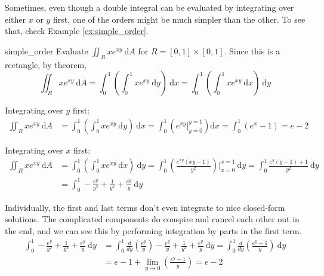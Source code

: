 Sometimes, even though a double integral can be evaluated by integrating over either $x$ or $y$ first, one of the orders might be much simpler than the other. To see that, check Example \ref{ex:simple_order}.

\begin{aexample}{}{simple_order}
    Evaluate $ \iint_R x e^{xy} \ \mathrm{d} A$ for $R = [0,1] \times [0,1]$. Since this is a rectangle, by  theorem,
    \begin{equation*}
        \iint_R x e^{xy} \ \mathrm{d} A = \int_{0}^{1} \left( \int_{0}^{1} x e^{xy} \ \mathrm{d} y\right) \ \mathrm{d} x = \int_{0}^{1} \left( \int_{0}^{1} x e^{xy} \ \mathrm{d} x\right) \ \mathrm{d} y
    \end{equation*}

    Integrating over $y$ first:
    \begin{equation*}
        \begin{aligned}
            \iint_R x e^{xy} \ \mathrm{d} A &= \int_{0}^{1} \left( \int_{0}^{1} x e^{xy} \ \mathrm{d} y\right) \ \mathrm{d} x = \int_{0}^{1} \left( e^{xy}\biggr \rvert_{y=0}^{y=1}\right) \mathrm{d} x =\int_{0}^{1} \left(e^x-1\right) = e-2
        \end{aligned}
    \end{equation*}

    Integrating over $x$ first:
    \begin{equation*}
        \begin{aligned}
            \iint_R x e^{xy} \ \mathrm{d} A &= \int_{0}^{1} \left( \int_{0}^{1} x e^{xy} \ \mathrm{d} x\right) \ \mathrm{d} y = \int_{0}^{1} \left( \frac{e^{x y} (x y-1)}{y^2} \right) \biggr \rvert_{x=0}^{x=1}\ \mathrm{d} y = \int_{0}^{1} \frac{e^y (y-1)+1}{y^2} \ \mathrm{d} y \\
            &= \int_{0}^{1} -\frac{e^y}{y^2}+\frac{1}{y^2}+\frac{e^y}{y} \ \mathrm{d} y
        \end{aligned}
    \end{equation*}

    Individually, the first and last terms don't even integrate to nice closed-form solutions. The complicated components do conspire and cancel each other out in the end, and we can see this by performing integration by parts in the first term.
    \begin{equation*}
        \begin{aligned}
            \int_{0}^{1} -\frac{e^y}{y^2}+\frac{1}{y^2}+\frac{e^y}{y} \ \mathrm{d} y &= \int_{0}^{1} \frac{d}{dy} \left(\frac{e^y}{y}\right)-\frac{e^y}{y}+\frac{1}{y^2}+\frac{e^y}{y} \ \mathrm{d} y = \int_{0}^{1} \frac{d}{dy} \left(\frac{e^y-1}{y}\right) \ \mathrm{d} y \\
            &=e-1 + \lim_{y\rightarrow 0} \left(\frac{e^y-1}{y}\right) = e-2
        \end{aligned}
    \end{equation*}
\end{aexample}

